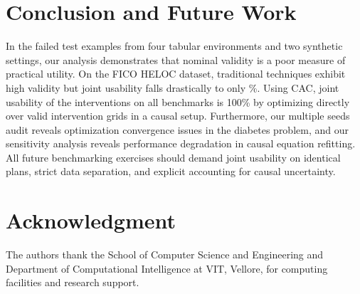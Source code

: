 \documentclass[nolineno]{paper/ieee-access/ieeeaccess}%
\newcommand{\CAC}{CAC}
\begin{document}
\section{Conclusion and Future Work}
\label{sec:conclusion}
In the \TotalApplicants{} failed test examples from four tabular environments and two synthetic settings, our analysis demonstrates that nominal validity is a poor measure of practical utility. On the FICO HELOC dataset, traditional techniques exhibit high validity but joint usability falls drastically to only \HelocWachterUsable\%. Using \CAC{}, joint usability of the interventions on all benchmarks is 100\% by optimizing directly over valid intervention grids in a causal setup. Furthermore, our multiple seeds audit reveals optimization convergence issues in the diabetes problem, and our sensitivity analysis reveals performance degradation in causal equation refitting. All future benchmarking exercises should demand joint usability on identical plans, strict data separation, and explicit accounting for causal uncertainty.

\section*{Acknowledgment}
The authors thank the School of Computer Science and Engineering and Department of Computational Intelligence at VIT, Vellore, for computing facilities and research support.
\end{document}
